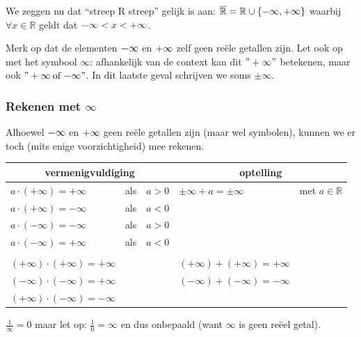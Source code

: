 We zeggen nu dat ``streep R streep'' gelijk is aan: $\overline{\mathbb{R}}=\mathbb{R}\cup\{\text{\textminus\ensuremath{\infty}},+\text{\ensuremath{\infty}}\}$
waarbij $\forall x\in\mathbb{R}$ geldt dat $\text{\textminus\ensuremath{\infty}}<x<+\text{\ensuremath{\infty}}$.




Merk op dat de elementen $\text{\textminus\ensuremath{\infty}}$
en $+\text{\ensuremath{\infty}}$ zelf geen re\"ele getallen zijn. Let
ook op met het symbool $\infty$: afhankelijk van de context kan dit
$"+\infty"$ betekenen, maar ook $"+\infty\:\mathrm{of}\:\text{\textminus\ensuremath{\infty}}"$.
In dit laatste geval schrijven we soms $\pm\infty$.


\subsubsection{Rekenen met $\infty$}

Alhoewel $\text{\textminus\ensuremath{\infty}}$ en $+\text{\ensuremath{\infty}}$
geen re\"ele getallen zijn (maar wel symbolen), kunnen we er toch (mits
enige voorzichtigheid) mee rekenen.



\begin{tabel*}{}
	\centering
	\begin{tabular}{lcc|ll}
		\multicolumn{3}{c|}{vermenigvuldiging} & \multicolumn{2}{c}{optelling}\\
		\hline 
		$a\cdot (+\infty)=+\infty$ & als & $a>0$ & $\pm\infty+a=\pm\infty$ & met $a\in\mathbb{R}$\\
		$a\cdot (+\infty)=-\infty$ & als & $a<0$ &  & \\
		$a\cdot (-\infty)=-\infty$ & als & $a>0$ &  & \\
		$a\cdot (-\infty)=+\infty$ & als & $a<0$ &  & \\
		&  &  &  & \\
		$(+\infty)\cdot (+\infty)=+\infty$ &  &   & $(+\infty)+(+\infty)=+\infty$ & \\
		$(-\infty)\cdot (-\infty)=+\infty$ &  &   & $(-\infty)+(-\infty)=-\infty$ & \\
		$(+\infty)\cdot (-\infty)=-\infty$ &  &   &  & \\
	\end{tabular}
\end{tabel*}




$\frac{1}{\infty}=0$ maar let op: $\frac{1}{0}=\infty$
en dus onbepaald (want $\infty$ is geen re\"eel getal).

